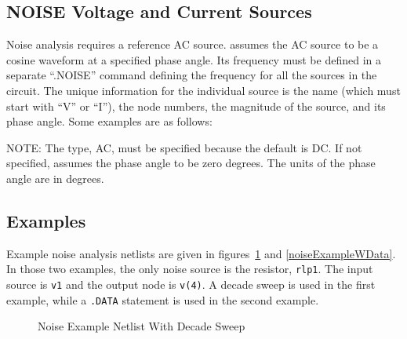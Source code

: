 \subsection{NOISE Voltage and Current Sources}
\label{NOISE_Sources}

Noise analysis requires a reference AC source.  \Xyce{} assumes the AC
source to be a cosine waveform at a specified phase angle. Its
frequency must be defined in a separate ``.NOISE'' command defining
the frequency for all the sources in the circuit. The unique
information for the individual source is the name (which must start
with ``V'' or ``I''), the node numbers, the magnitude of the source,
and its phase angle. Some examples are as follows:


NOTE: The type, AC, must be specified because the default is DC. If
not specified, \Xyce{} assumes the phase angle to be zero degrees.
The units of the phase angle are in degrees.

\subsection{Examples}

Example noise analysis netlists are given in
figures~\ref{noiseExample} and \ref{noiseExampleWData}.  In those two
examples, the only noise source is the resistor, \texttt{rlp1}.  The
input source is \texttt{v1} and the output node is \texttt{v(4)}.  A
decade sweep is used in the first example, while a \texttt{.DATA}
statement is used in the second example.
\begin{figure}[htbp]
  \begin{centering}
\caption[Noise Example Netlist With Decade Sweep]
{Noise Example Netlist With Decade Sweep\label{noiseExample} }
\end{centering}
\end{figure}

